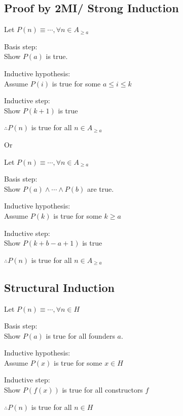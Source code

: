 \documentclass[12pt, a4paper]{article}
\begin{document}
\begin{multicols*}{3}
\subsection{Proof by 2MI/ Strong Induction}
\begin{enumproof}[parsep=0em]
\item Let $P(n) \equiv \cdots, \forall n \in A_{\geq a}$
  \item Basis step:\\Show $P(a)$ is true.
  \item Inductive hypothesis:\\Assume $P(i)$ is true for some $a \leq i \leq k$
  \item Inductive step:\\Show $P(k+1)$ is true
  \item $\therefore P(n)$ is true for all $n \in A_{\geq a}$
\end{enumproof}
\vspace{-1em}
Or
\vspace{-1em}
\begin{enumproof}[parsep=0em]
\item Let $P(n) \equiv \cdots, \forall n \in A_{\geq a}$
  \item Basis step:\\Show $P(a) \land \cdots \land P(b)$ are true.
  \item Inductive hypothesis:\\Assume $P(k)$ is true for some $k \geq a$
  \item Inductive step:\\Show $P(k+b-a+1)$ is true
  \item $\therefore P(n)$ is true for all $n \in A_{\geq a}$
\end{enumproof}

\subsection{Structural Induction}
\begin{enumproof}[parsep=0em]
\item Let $P(n) \equiv \cdots, \forall n \in H$
  \item Basis step:\\Show $P(a)$ is true for all founders $a$.
  \item Inductive hypothesis:\\Assume $P(x)$ is true for some $x \in H$
  \item Inductive step:\\Show $P(f(x))$ is true for all constructors $f$
  \item $\therefore P(n)$ is true for all $n \in H$
\end{enumproof}

\end{multicols*}
\end{document}
